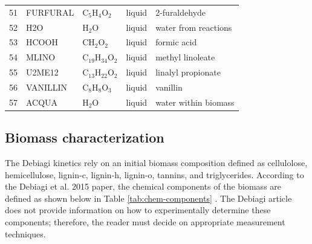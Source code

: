 \begin{center}
\begin{longtable}{cllll}
        51 & FURFURAL       & C$_5$H$_4$O$_2$         & \cellcolor{blue!25}liquid        & 2-furaldehyde \\
        52 & H2O            & H$_2$O                  & \cellcolor{blue!25}liquid        & water from reactions \\
        53 & HCOOH          & CH$_2$O$_2$             & \cellcolor{blue!25}liquid        & formic acid \\
        54 & MLINO          & C$_{19}$H$_{34}$O$_2$   & \cellcolor{blue!25}liquid        & methyl linoleate \\
        55 & U2ME12         & C$_{13}$H$_{22}$O$_2$   & \cellcolor{blue!25}liquid        & linalyl propionate \\
        56 & VANILLIN       & C$_8$H$_8$O$_3$         & \cellcolor{blue!25}liquid        & vanillin \\
        57 & ACQUA          & H$_2$O                  & \cellcolor{blue!25}liquid        & water within biomass \\
        \bottomrule
    \end{longtable}
\end{center}

\subsection{Biomass characterization}

The Debiagi kinetics rely on an initial biomass composition defined as cellulolose, hemicellulose, lignin-c, lignin-h, lignin-o, tannins, and triglycerides. According to the Debiagi et al. 2015 paper, the chemical components of the biomass are defined as shown below in Table \ref{tab:chem-components} \cite{Debiagi-2015}. The Debiagi article does not provide information on how to experimentally determine these components; therefore, the reader must decide on appropriate measurement techniques.

